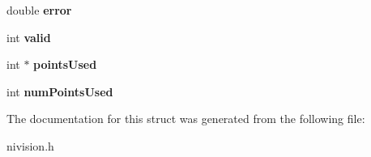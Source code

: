 \begin{DoxyCompactItemize}
\item 
\hypertarget{structBestEllipse2__struct_aaa2ac4cc8639fde286723fa2154bbc69}{double {\bfseries error}}\label{structBestEllipse2__struct_aaa2ac4cc8639fde286723fa2154bbc69}

\item 
\hypertarget{structBestEllipse2__struct_a0dbb91e79bbe2676ec1ace63fbf6b3ec}{int {\bfseries valid}}\label{structBestEllipse2__struct_a0dbb91e79bbe2676ec1ace63fbf6b3ec}

\item 
\hypertarget{structBestEllipse2__struct_aea03634e451f6cefc809dcb34ff55873}{int $\ast$ {\bfseries points\-Used}}\label{structBestEllipse2__struct_aea03634e451f6cefc809dcb34ff55873}

\item 
\hypertarget{structBestEllipse2__struct_a1c152f7ec28e71759a0b62cbed7d9f71}{int {\bfseries num\-Points\-Used}}\label{structBestEllipse2__struct_a1c152f7ec28e71759a0b62cbed7d9f71}

\end{DoxyCompactItemize}


\-The documentation for this struct was generated from the following file\-:\begin{DoxyCompactItemize}
\item 
nivision.\-h\end{DoxyCompactItemize}
